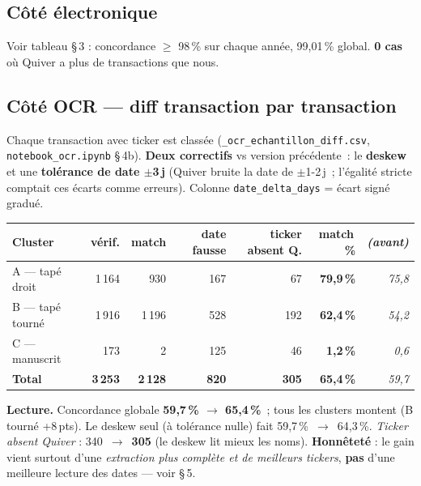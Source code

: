 \documentclass[11pt,a4paper]{article}
\newcommand{\file}[1]{\texttt{\small #1}}
\begin{document}
\subsection*{Côté électronique}

Voir tableau §\,3 : concordance $\ge$ 98\,\% sur chaque année, 99,01\,\% global.
\textbf{0 cas} où Quiver a plus de transactions que nous.

\subsection*{Côté OCR --- diff transaction par transaction}

Chaque transaction avec ticker est classée (\file{\_ocr\_echantillon\_diff.csv},
\file{notebook\_ocr.ipynb} §\,4b). \textbf{Deux correctifs} vs version précédente~: le
\textbf{deskew} et une \textbf{tolérance de date $\pm$3\,j} (Quiver bruite la date de
$\pm$1-2\,j~; l'égalité stricte comptait ces écarts comme erreurs). Colonne
\texttt{date\_delta\_days} = écart signé gradué.

\begin{center}
\begin{tabular}{@{}l r r r r r r@{}}
\toprule
\textbf{Cluster} & \textbf{vérif.} & \textbf{match} & \textbf{date fausse}
  & \textbf{ticker absent Q.} & \textbf{match\,\%} & \emph{(avant)} \\
\midrule
A --- tapé droit  & 1\,164 & 930   & 167 &  67 & \textbf{79,9\,\%} & \emph{75,8} \\
B --- tapé tourné & 1\,916 & 1\,196 & 528 & 192 & \textbf{62,4\,\%} & \emph{54,2} \\
C --- manuscrit   &    173 &   2   & 125 &  46 &  \textbf{1,2\,\%} & \emph{0,6} \\
\midrule
\textbf{Total}    & \textbf{3\,253} & \textbf{2\,128} & \textbf{820}
  & \textbf{305} & \textbf{65,4\,\%} & \emph{59,7} \\
\bottomrule
\end{tabular}
\end{center}

\noindent\textbf{Lecture.} Concordance globale \textbf{59,7\,\% $\to$ 65,4\,\%}~; tous les
clusters montent (B tourné +8\,pts). Le deskew seul (à tolérance nulle) fait
59,7\,\%~$\to$~64,3\,\%. \emph{Ticker absent Quiver} : 340~$\to$~\textbf{305} (le deskew lit
mieux les noms). \textbf{Honnêteté} : le gain vient surtout d'une \emph{extraction plus
complète et de meilleurs tickers}, \textbf{pas} d'une meilleure lecture des dates --- voir §\,5.
\end{document}
